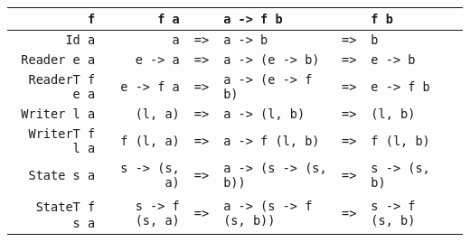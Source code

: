 \documentclass{tufte-handout}
\newcommand{\rarr}{\texttt{=>}}
\newcommand{\fThree}[3]{\texttt{#1} & \rarr & \texttt{#2} & \rarr & \texttt{#3}}
\begin{document}
\begin{table}[ht]
  \centering
  \selectfont
  \setlength{\tabcolsep}{5pt}
  \begin{tabular}{rrrlcll}
    \texttt{f} & \texttt{f a} &  & \texttt{a -> f b} & & \texttt{f b} \\
    \midrule
    \texttt{Id a}               & \fThree{a}{a -> b}{b} \\
    \texttt{Reader e a}      & \fThree{e -> a}{a -> (e -> b)}{e -> b} \\
    \texttt{ReaderT f e a}      & \fThree{e -> f a}{a -> (e -> f b)}{e -> f b} \\
    \texttt{Writer l a}        & \fThree{(l, a)}{a -> (l, b)}{(l, b)} \\
    \texttt{WriterT f l a}        & \fThree{f (l, a)}{a -> f (l, b)}{f (l, b)} \\
    \texttt{State s a}         & \fThree{s -> (s, a)}{a -> (s -> (s, b))}{s -> (s, b)} \\   \
    \texttt{StateT f s a}         & \fThree{s -> f (s, a)}{a -> (s -> f (s, b))}{s -> f (s, b)} \\

  \end{tabular}
  \label{tab:normaltab}
\end{table}




\end{document}
